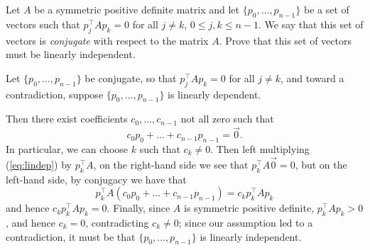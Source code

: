 \documentclass{../../../kin_math}
\begin{document}
\begin{questions}
  \question Let $A$ be a symmetric positive definite matrix and let $\{p_0, \dots, p_{n - 1}\}$ be a set of vectors such that $p_j^\top A p_k = 0$ for all $j \neq k$, $0 \leq j, k \leq n - 1$. We say that this set of vectors is \emph{conjugate} with respect to the matrix $A$. Prove that this set of vectors must be linearly independent.
  \begin{solution}
    Let $\{p_0, \dots, p_{n - 1}\}$ be conjugate, so that $p_j^\top A p_k = 0$ for all $j \neq k$, and toward a contradiction, suppose $\{p_0, \dots, p_{n - 1}\}$ is linearly dependent.

    Then there exist coefficients $c_0, \dots, c_{n - 1}$ not all zero such that
    \begin{equation}
      \label{eq:lindep}
      c_0 p_0 + \dots + c_{n - 1} p_{n - 1} = \vec{0}.
    \end{equation}
    In particular, we can choose $k$ such that $c_k \neq 0$. Then left multiplying (\ref{eq:lindep}) by $p_k^\top A$, on the right-hand side we see that $p_k^\top A \vec{0} = 0$, but on the left-hand side, by conjugacy we have that
    \begin{equation*}
      p_k^\top A (c_0 p_0 + \dots + c_{n - 1} p_{n - 1}) = c_k p_k^\top A p_k
    \end{equation*}
    and hence $c_k p_k^\top A p_k = 0$. Finally, since $A$ is symmetric positive definite, $p_k^\top A p_k > 0$, and hence $c_k = 0$, contradicting $c_k \neq 0$; since our assumption led to a contradiction, it must be that $\{p_0, \dots, p_{n - 1}\}$ is linearly independent.
  \end{solution}
\end{questions}
\end{document}
